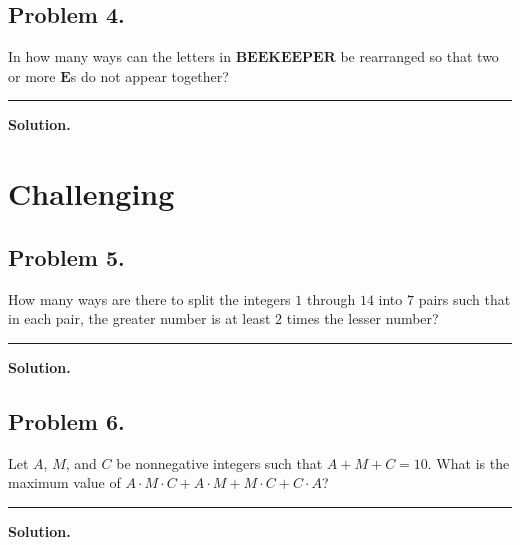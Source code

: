 \documentclass{article}
\newcommand {\MyLine} {
    \smallskip \noindent\rule{\textwidth}{0.4pt} \smallskip
}
\begin{document}
\begin{minipage}[t][0.45\textheight][t]{\textwidth}

\subsection*{Problem 4.} %
{\color {Gray}
In how many ways can the letters in $\textbf{BEEKEEPER}$
be rearranged so that two or more $\textbf{E}$s do
not appear together?
}

\MyLine

\textbf{Solution.}

\end{minipage}

\section*{\textcolor{BrickRed}{Challenging}}
\begin{minipage}[t][0.45\textheight][t]{\textwidth}
\subsection*{Problem 5.} %
{\color {Gray}
How many ways are there to split the integers $1$
through $14$ into $7$ pairs such that in each pair,
the greater number is at least $2$ times the lesser
number?
}

\MyLine

\textbf{Solution.}

\end{minipage}

\begin{minipage}[t][0.45\textheight][t]{\textwidth}
\subsection*{Problem 6.} %
{\color {Gray}
Let $A$, $M$, and $C$ be nonnegative integers such
that $A+M+C=10$. What is the maximum value of
$A\cdot M\cdot C+A\cdot M+M\cdot C+C\cdot A$?
}

\MyLine

\textbf{Solution.}

\end{minipage}
\end{document}
